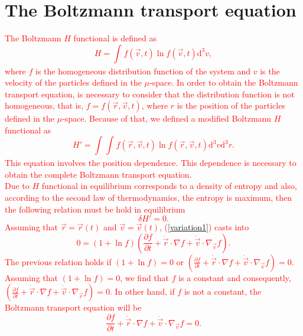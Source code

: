 \documentclass{article}
\begin{document}
\section{The Boltzmann transport equation}
\textcolor{red}{The Boltzmann $H$ functional is defined as
\begin{equation}
    H=\int_{}^{}f(\vec{v},t)\ln f(\vec{v},t)\mathrm{d}^{3}v,
\end{equation}
where $f$ is the homogeneous distribution function of the system and $v$ is the velocity of the particles defined in the $\mu$-space. In order to obtain the Boltzmann transport equation, is necessary to consider that the distribution function is not homogeneous, that is, $f=f(\vec{r},\vec{v},t)$, where $r$ is the position of the particles defined in the $\mu$-space. Because of that, we defined a modified Boltzmann $H$ functional as
\begin{equation}
    H'=\int_{}^{}\int_{}^{}f(\vec{r},\vec{v},t)\ln f(\vec{r},\vec{v},t)\mathrm{d}^{3}v \mathrm{d}^{3}r.
\end{equation}
This equation involves the position dependence. This dependence is necessary to obtain the complete Boltzmann transport equation.\\
Due to $H$ functional in equilibrium corresponds to a density of entropy and also, according to the second law of thermodynamics, the entropy is maximum, then the following relation must be hold in equilibrium
\begin{equation}
    \delta H'=0.\label{variation1}
\end{equation}
Assuming that $\vec{r}=\vec{r}(t)$ and $\vec{v}=\vec{v}(t)$, (\ref{variation1}) casts into
\begin{equation}
    0=\left( 1+\ln f \right)\left( \frac{\partial f}{\partial t}+\dot{\vec{r}}\cdot \nabla f+\dot{\vec{v}}\cdot \nabla_{\vec{v}} f \right).
\end{equation}
The previous relation holds if $(1+\ln f)=0$ or $(\frac{\partial f}{\partial t}+\dot{\vec{r}}\cdot \nabla f+\dot{\vec{v}}\cdot \nabla_{\vec{v}} f)=0$.\\
Assuming that $(1+\ln f)=0$, we find that $f$ is a constant and consequently, $(\frac{\partial f}{\partial t}+\dot{\vec{r}}\cdot \nabla f+\dot{\vec{v}}\cdot \nabla_{\vec{v}} f)=0$. In other hand, if $f$ is not a constant, the Boltzmann transport equation will be
\begin{equation}
    \frac{\partial f}{\partial t}+\dot{\vec{r}}\cdot \nabla f+\dot{\vec{v}}\cdot \nabla_{\vec{v}} f=0.\label{transport}
\end{equation}
}
\end{document}
